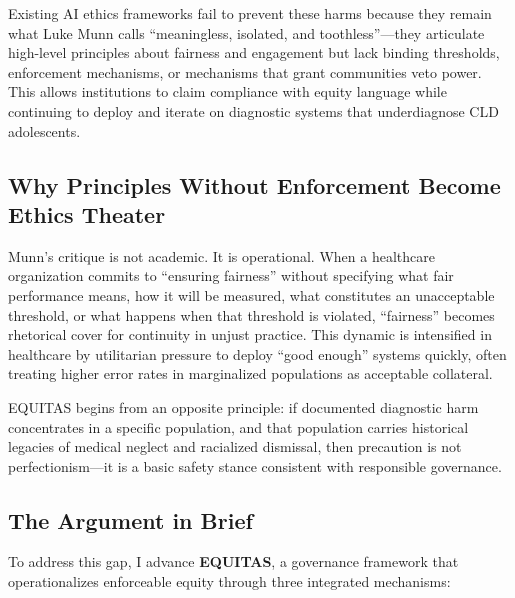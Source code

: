 \documentclass[12pt,a4paper]{article}
\begin{document}
Existing AI ethics frameworks fail to prevent these harms because they remain what Luke Munn calls ``meaningless, isolated, and toothless''—they articulate high-level principles about fairness and engagement but lack binding thresholds, enforcement mechanisms, or mechanisms that grant communities veto power.\cite{munn_idai700} This allows institutions to claim compliance with equity language while continuing to deploy and iterate on diagnostic systems that underdiagnose CLD adolescents.

\subsection{Why Principles Without Enforcement Become Ethics Theater}

Munn's critique is not academic. It is operational. When a healthcare organization commits to ``ensuring fairness'' without specifying what fair performance means, how it will be measured, what constitutes an unacceptable threshold, or what happens when that threshold is violated, ``fairness'' becomes rhetorical cover for continuity in unjust practice.\cite{munn_idai700} This dynamic is intensified in healthcare by utilitarian pressure to deploy ``good enough'' systems quickly, often treating higher error rates in marginalized populations as acceptable collateral.\cite{munn_idai700}

EQUITAS begins from an opposite principle: if documented diagnostic harm concentrates in a specific population, and that population carries historical legacies of medical neglect and racialized dismissal, then precaution is not perfectionism—it is a basic safety stance consistent with responsible governance.\cite{garcia_ed415}

\subsection{The Argument in Brief}

To address this gap, I advance \textbf{EQUITAS}, a governance framework that operationalizes enforceable equity through three integrated mechanisms:
\end{document}
